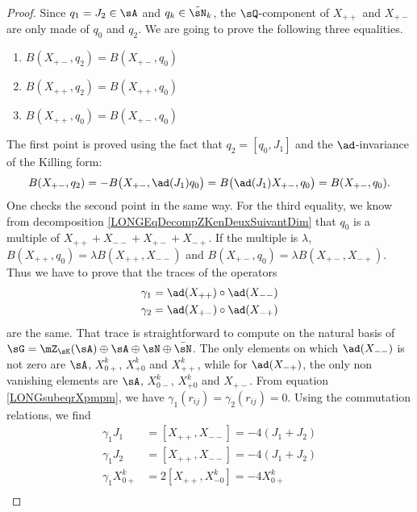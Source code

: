\begin{proof}
	Since $q_1=J_2\in\sA$ and $q_k\in\tilde\sN_k$, the $\sQ$-component of $X_{++}$ and $X_{+-}$ are only made of $q_0$ and $q_2$.
	We are	going to prove the following three equalities.
	\begin{enumerate}

		\item\label{LONGItemBpmqDeux}
		$B(X_{+-},q_2)=B(X_{+-},q_0)$
		\item
		      $B(X_{++},q_2)=B(X_{++},q_0)$
		\item
		      $B(X_{++},q_0)=B(X_{+-},q_0)$
	\end{enumerate}

	The first point is proved using the fact that $q_2=[q_0,J_1]$ and the $\ad$-invariance of the Killing form:
	\begin{equation}
		B(X_{+-},q_2)=-B\big( X_{+-},\ad(J_1)q_0 \big)=B\big( \ad(J_1)X_{+-},q_0 \big)=B(X_{+-},q_0).
	\end{equation}
	One checks the second point in the same way. For the third equality, we know from decomposition \eqref{LONGEqDecompZKenDeuxSuivantDim} that $q_0$ is a multiple of $X_{++}+X_{--}+X_{+-}+X_{-+}$. If the multiple is $\lambda$, $B(X_{++},q_0)=\lambda B(X_{++},X_{--})$ and $B(X_{+-},q_0)=\lambda B(X_{+-},X_{-+})$. Thus we have to prove that the traces of the operators
	\begin{equation}
		\begin{aligned}[]
			\gamma_1 & =\ad(X_{++})\circ\ad(X_{--}) \\
			\gamma_2 & =\ad(X_{+-})\circ\ad(X_{-+})
		\end{aligned}
	\end{equation}
	are the same. That trace is straightforward to compute on the natural basis of $\sG=\mZ_{\sK}(\sA)\oplus\sA\oplus\sN\oplus\bar\sN$.
	The only elements on which $\ad(X_{--})$ is not zero are $\sA$, $X^k_{0+}$, $X^k_{+0}$ and $X^k_{++}$, while for $\ad(X_{-+})$, the only non vanishing elements are $\sA$, $X^k_{0-}$, $X^k_{+0}$ and $X_{+-}$. From equation \eqref{LONGsubeqrXpmpm}, we have $\gamma_1(r_{ij})=\gamma_2(r_{ij})=0$. Using the commutation relations, we find
	\begin{subequations}
		\begin{align}
			\gamma_1J_1      & =[X_{++},X_{--}]=-4(J_1+J_2)    \\
			\gamma_1J_2      & =[X_{++},X_{--}]=-4(J_1+J_2)    \\
			\gamma_1X^k_{0+} & =2[X_{++},X^k_{-0}]=-4X^k_{0+}  \\

\end{align}
\end{subequations}
\end{proof}
